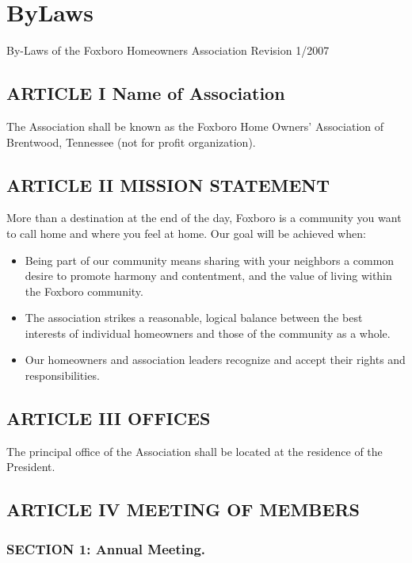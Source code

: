 \section{ByLaws}
By-Laws of the Foxboro Homeowners Association
Revision 1/2007


\subsection{ARTICLE I Name of Association}

The Association shall be known as the Foxboro Home Owners’ Association of Brentwood, Tennessee (not for profit organization).

\subsection{ARTICLE II MISSION STATEMENT}

More than a destination at the end of the day, Foxboro is a community
you want to call home and where you feel at home. Our goal will be
achieved when:

\begin{itemize}
\item Being part of our community means sharing with your neighbors a common
desire to promote harmony and contentment, and the value of living within
the Foxboro community.

\item The association strikes a reasonable, logical balance between the best
interests of individual homeowners and those of the community as a whole.

\item Our homeowners and association leaders recognize and accept their rights
and responsibilities.
\end{itemize}

\subsection{ARTICLE III OFFICES}

The principal office of the Association shall be located at the residence
of the President.

\subsection{ARTICLE IV MEETING OF MEMBERS}

\subsubsection{SECTION 1: Annual Meeting.}

